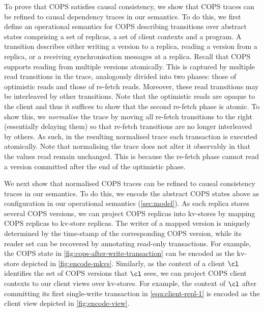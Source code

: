 To prove that COPS satisfies causal consistency,
we show that COPS traces can be refined to causal dependency traces in our semantics.
To do this, we first define an operational semantics for COPS describing transitions over abstract states comprising a set of replicas, a set of client contexts and a program.
A transition describes either writing a version to a replica, reading a version from a replica, or a receiving synchronisation messages at a replica.
Recall that COPS supports reading from multiple versions atomically. 
This is captured by multiple read transitions in the trace, analogously divided into two phases: those of optimistic reads and those of re-fetch reads.
Moreover, these read transitions may be interleaved by other transitions. 
Note that the optimistic reads are opaque to the client and
thus it suffices to show that the second re-fetch phase is atomic.
To show this, we \emph{normalise} the trace by moving all re-fetch transitions to the right (essentially delaying them) so that re-fetch transitions are no longer interleaved by others.
As such, in the resulting normalised trace each transaction is executed atomically. 
Note that normalising the trace does not alter it observably in that the values read remain unchanged. 
This is because the re-fetch phase cannot read a version committed after the end of the optimistic phase.



We next show that normalised COPS traces can be refined to causal consistency traces in our semantics.
To do this, we encode the abstract COPS states above as configuration in our operational semantics (\cref{sec:model}). 
As each replica stores several COPS versions, 
we can project COPS replicas into kv-stores
by mapping COPS replicas to kv-store replicas.
The writer of a mapped version is uniquely
determined by the time-stamp of the corresponding COPS version, while
its reader set 
can be recovered by annotating read-only transactions.
For example, the COPS state in \cref{fig:cops-after-write-transaction} can be encoded as the kv-store depicted in \cref{fig:encode-mkvs}.
Similarly, as the context of a client $\cl$ identifies the set of COPS versions that $\cl$ sees, 
we can project COPS client contexts to our client views over kv-stores. 
For example, the context of \( \cl \) after committing its first single-write transaction in \eqref{equ:client-repl-1} is encoded as the client view depicted in \cref{fig:encode-view}.

